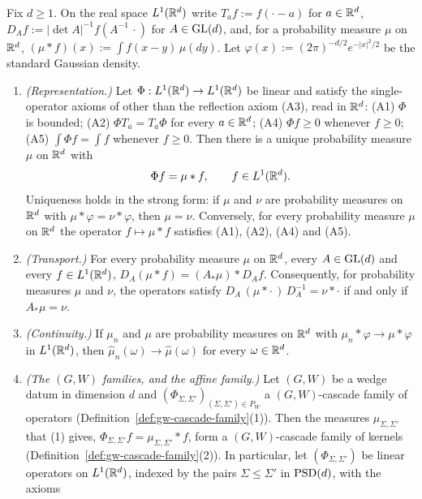 \begin{lemma}\label{lem:operators-to-kernels}
Fix $d \ge 1$. On the real space $L^1(\mathbb{R}^d)$ write $T_af := f(\cdot - a)$ for $a \in \mathbb{R}^d$,
$D_Af := |\det A|^{-1}f(A^{-1}\,\cdot)$ for $A \in \mathrm{GL}(d)$, and, for a probability measure $\mu$
on $\mathbb{R}^d$, $(\mu * f)(x) := \int f(x - y)\,\mu(dy)$. Let $\varphi(x) := (2\pi)^{-d/2}e^{-|x|^2/2}$
be the standard Gaussian density.
\begin{enumerate}
\item \emph{(Representation.)} Let $\Phi : L^1(\mathbb{R}^d) \to L^1(\mathbb{R}^d)$ be linear and satisfy the
single-operator axioms of  other than the reflection axiom (A3), read in $\mathbb{R}^d$:
(A1) $\Phi$ is
bounded; (A2) $\Phi T_a = T_a\Phi$ for every $a \in \mathbb{R}^d$; (A4) $\Phi f \ge 0$ whenever
$f \ge 0$; (A5) $\int\Phi f = \int f$ whenever $f \ge 0$. Then there is a unique probability
measure $\mu$ on $\mathbb{R}^d$ with
\[
  \Phi f = \mu * f, \qquad f \in L^1(\mathbb{R}^d) .
\]
Uniqueness holds in the strong form: if $\mu$ and $\nu$ are probability measures on $\mathbb{R}^d$ with
$\mu * \varphi = \nu * \varphi$, then $\mu = \nu$. Conversely, for every probability measure $\mu$
on $\mathbb{R}^d$ the operator $f \mapsto \mu * f$ satisfies (A1), (A2), (A4) and (A5).
\item \emph{(Transport.)} For every probability measure $\mu$ on $\mathbb{R}^d$, every $A \in \mathrm{GL}(d)$ and
every $f \in L^1(\mathbb{R}^d)$, $D_A(\mu * f) = (A_*\mu) * D_Af$. Consequently, for probability measures
$\mu$ and $\nu$, the operators satisfy $D_A\,(\mu * \cdot\,)\,D_A^{-1} = \nu * \cdot$ if and only
if $A_*\mu = \nu$.
\item \emph{(Continuity.)} If $\mu_n$ and $\mu$ are probability measures on $\mathbb{R}^d$ with
$\mu_n * \varphi \to \mu * \varphi$ in $L^1(\mathbb{R}^d)$, then $\widehat\mu_n(\omega) \to
\widehat\mu(\omega)$ for every $\omega \in \mathbb{R}^d$.
\item \emph{(The $(G, W)$ families, and the affine family.)} Let $(G, W)$ be a wedge datum in
dimension $d$ and $(\Phi_{\Sigma,\Sigma'})_{(\Sigma,\Sigma') \in P_W}$ a $(G, W)$-cascade family of
operators (Definition~\ref{def:gw-cascade-family}(1)). Then the measures $\mu_{\Sigma,\Sigma'}$ that (1) gives,
$\Phi_{\Sigma,\Sigma'}f = \mu_{\Sigma,\Sigma'} * f$, form a $(G, W)$-cascade family of kernels
(Definition~\ref{def:gw-cascade-family}(2)). In particular, let $(\Phi_{\Sigma,\Sigma'})$ be linear
operators on $L^1(\mathbb{R}^d)$, indexed by the pairs $\Sigma \le \Sigma'$ in $\mathrm{PSD}(d)$, with the axioms

\end{enumerate}
\end{lemma}
